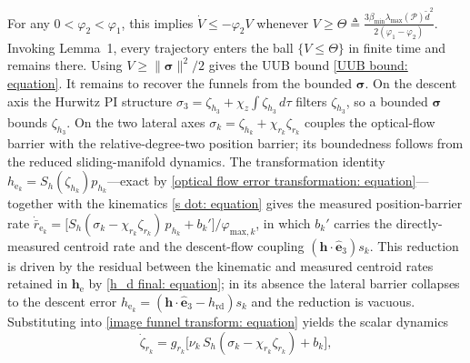 \documentclass{IEEEtaes}
\begin{document}
For any $0<\varphi_2<\varphi_1$, this implies $\dot{V}\le-\varphi_2 V$ whenever $V\ge\Theta\triangleq \tfrac{3\beta_{\min}\lambda_{\max}(\mathcal{P})\tilde{d}^2}{2(\varphi_1-\varphi_2)}$. Invoking Lemma~1, every trajectory enters the ball $\{V\le\Theta\}$ in finite time and remains there. Using $V\ge\|\boldsymbol{\sigma}\|^2/2$ gives the UUB bound \eqref{UUB bound: equation}. It remains to recover the funnels from the bounded $\boldsymbol{\sigma}$. On the descent axis the Hurwitz PI structure $\sigma_3=\zeta_{h_3}+\chi_z\!\int\zeta_{h_3}\,d\tau$ filters $\zeta_{h_3}$, so a bounded $\boldsymbol{\sigma}$ bounds $\zeta_{h_3}$. On the two lateral axes $\sigma_k=\zeta_{h_k}+\chi_{r_k}\zeta_{r_k}$ couples the optical-flow barrier with the relative-degree-two position barrier; its boundedness follows from the reduced sliding-manifold dynamics. The transformation identity $h_{\text{e}_k}=S_h(\zeta_{h_k})p_{h_k}$---exact by \eqref{optical flow error transformation: equation}---together with the kinematics \eqref{s dot: equation} gives the measured position-barrier rate $\dot{\bar{r}}_{\text{e}_k}=\big[S_h(\sigma_k-\chi_{r_k}\zeta_{r_k})\,p_{h_k}+b_k'\big]/\varphi_{\text{max},k}$, in which $b_k'$ carries the directly-measured centroid rate and the descent-flow coupling $(\boldsymbol{h}\cdot\hat{\boldsymbol{e}}_3)s_k$. This reduction is driven by the residual between the kinematic and measured centroid rates retained in $\boldsymbol{h}_\text{e}$ by \eqref{h_d final: equation}; in its absence the lateral barrier collapses to the descent error $h_{\text{e}_k}=(\boldsymbol{h}\cdot\hat{\boldsymbol{e}}_3-h_\text{rd})s_k$ and the reduction is vacuous. Substituting into \eqref{image funnel transform: equation} yields the scalar dynamics
\begin{equation*}
    \dot{\zeta}_{r_k}=g_{r_k}\big[\nu_k\,S_h(\sigma_k-\chi_{r_k}\zeta_{r_k})+b_k\big],
\end{equation*}
\end{document}
